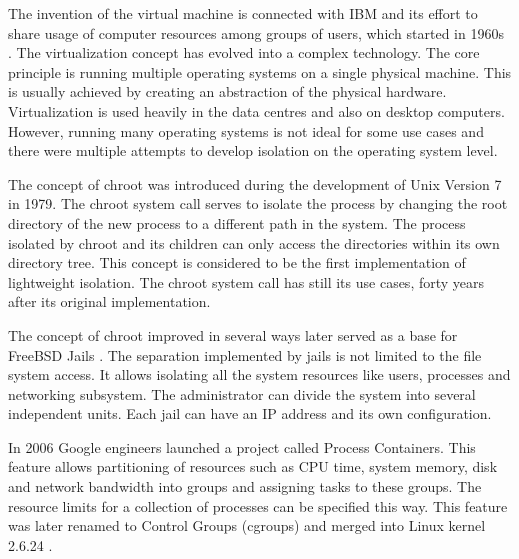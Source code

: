 \documentclass[
  digital, %
  twoside, %
  table,   %
  nolof,   %
  nolot,   %
]{fithesis3}
\begin{document}
The invention of the virtual machine is connected with IBM and its effort to share usage of computer resources among groups of users, which started in 1960s \cite{vm_history}. The virtualization concept has evolved into a complex technology. The core principle is running multiple operating systems on a single physical machine. This is usually achieved by creating an abstraction of the physical hardware. Virtualization is used heavily in the data centres and also on desktop computers. However, running many operating systems is not ideal for some use cases and there were multiple attempts to develop isolation on the operating system level.

The concept of chroot \cite{chroot} was introduced during the development of Unix Version 7 in 1979. The chroot system call serves to isolate the process by changing the root directory of the new process to a different path in the system. The process isolated by chroot and its children can only access the directories within its own directory tree. This concept is considered to be the first implementation of lightweight isolation. The chroot system call has still its use cases, forty years after its original implementation.

The concept of chroot improved in several ways later served as a base for FreeBSD Jails \cite{freebsd_jails}. The separation implemented by jails is not limited to the file system access. It allows isolating all the system resources like users, processes and networking subsystem. The administrator can divide the system into several independent units. Each jail can have an IP address and its own configuration.

In 2006 Google engineers launched a project called Process Containers. This feature allows partitioning of resources such as CPU time, system memory, disk and network bandwidth into groups and assigning tasks to these groups. The resource limits for a collection of processes can be specified this way. This feature was later renamed to Control Groups (cgroups) and merged into Linux kernel 2.6.24 \cite{cgroups}.
\end{document}
